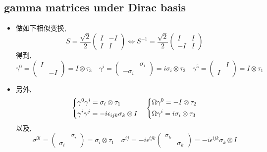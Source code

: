 \subsection{gamma matrices under Dirac basis}
\begin{itemize}
	\item 做如下相似变换,
	\begin{equation}
		S = \frac{\sqrt{2}}{2} \begin{pmatrix}
			I & - I \\
			I & I
		\end{pmatrix} \iff S^{- 1} = \frac{\sqrt{2}}{2} \begin{pmatrix}
			I & I \\
			- I & I
		\end{pmatrix}
	\end{equation}
	得到,
	\begin{equation}
		\gamma^0 = \begin{pmatrix}
			I & \\
			& - I
		\end{pmatrix} = I \otimes \tau_3 \quad \gamma^i = \begin{pmatrix}
			& \sigma_i \\
			- \sigma_i &
		\end{pmatrix} = i \sigma_i \otimes \tau_2 \quad \gamma^5 = \begin{pmatrix}
			& I \\
			I &
		\end{pmatrix} = I \otimes \tau_1
	\end{equation}
	
	\item 另外,
	\begin{equation}
		\begin{dcases}
			\gamma^0 \gamma^i = \sigma_i \otimes \tau_1 \\
			\gamma^i \gamma^j = - i \epsilon_{i j k} \sigma_k \otimes I
		\end{dcases} \quad \begin{dcases}
			\Omega \gamma^0 = - I \otimes \tau_2 \\
			\Omega \gamma^i = i \sigma_i \otimes \tau_3
		\end{dcases}
	\end{equation}
	以及,
	\begin{equation}
		\sigma^{0 i} = \begin{pmatrix}
			& \sigma_i \\
			\sigma_i &
		\end{pmatrix} = \sigma_i \otimes \tau_1 \quad \sigma^{i j} = - i \epsilon^{i j k} \begin{pmatrix}
			\sigma_k & \\
			& \sigma_k
		\end{pmatrix} = - i \epsilon^{i j k} \sigma_k \otimes I
	\end{equation}
\end{itemize}

